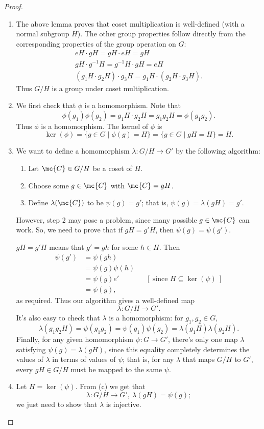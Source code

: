 \documentclass[math1530-lecture-notes]{subfiles}
\begin{document}
\begin{proof}[Proof]
  \begin{enumerate}
    \item The above lemma proves that coset multiplication is well-defined (with a normal subgroup
      $H$). The other group properties follow directly from the corresponding properties of the
      group operation on $G$:
      \begin{gather}
        eH\cdot gH=gH\cdot eH=gH\\
        gH\cdot g^{-1}H=g^{-1}H\cdot gH=eH\\
        (g_1H\cdot g_2H)\cdot g_3H=g_1H\cdot (g_2H\cdot g_3H)
      .\end{gather} Thus $G / H$ is a group under coset multiplication.
    \item We first check that $\phi$ is a homomorphism. Note that \[
        \phi(g_1)\phi(g_2)=g_1H\cdot g_2H=g_1g_2H=\phi(g_1g_2)
      .\] Thus $\phi$ is a homomorphism. The kernel of $\phi$ is \[
        \ker{(\phi)}=\{g\in G\mid \phi(g)=H \} =\{g\in G\mid gH=H\} =H
      .\] 
    \item We want to define a homomorphism $\lambda:G / H \to G'$ by the following algorithm:
      \begin{enumerate}
        \item Let $\mc{C}\in G / H$ be a coset of $H$.
        \item Choose some $g\in \mc{C}$ with $\mc{C}=gH$.
        \item Define $\lambda(\mc{C})$ to be $\psi(g)=g'$; that is, $\psi(g)=\lambda(gH)=g'$.
      \end{enumerate}
      However, step 2 may pose a problem, since many possible $g\in \mc{C}$ can work. So, we need to
      prove that if $gH=g'H$, then $\psi(g)=\psi(g')$.

      $gH=g'H$ means that $g'=gh$ for some $h\in H$. Then
      \begin{align*}
        \psi(g')&= \psi(gh) \\
                &= \psi(g)\psi(h)\\
                &=\psi(g)e' && [~\text{since $H\subseteq \ker{(\psi)}$}~]\\
                &=\psi(g)
      ,\end{align*} as required. Thus our algorithm gives a well-defined map \[
        \lambda: G / H \longrightarrow G'
      .\] It's also easy to check that $\lambda$ is a homomorphism: for $g_1,g_2\in G$, \[
        \lambda(g_1g_2H)=\psi(g_1g_2)=\psi(g_1)\psi(g_2)=\lambda(g_1H)\lambda(g_2H)
      .\] Finally, for any given homomorphism $\psi:G\to G'$, there's only one map $\lambda$
      satisfying $\psi(g)=\lambda(gH)$, since this equality completely determines the values of
      $\lambda$ in terms of values of $\psi$; that is, for any $\lambda$ that maps $G / H$ to $G'$,
      every $gH\in G / H$ must be mapped to the same $\psi$.
    \item Let $H=\ker{(\psi)}$. From (c) we get that \[
        \lambda: G / H\longrightarrow G',\ \lambda(gH)=\psi(g)
    ;\] we just need to show that $\lambda$ is injective.


\end{enumerate}
\end{proof}
\end{document}
